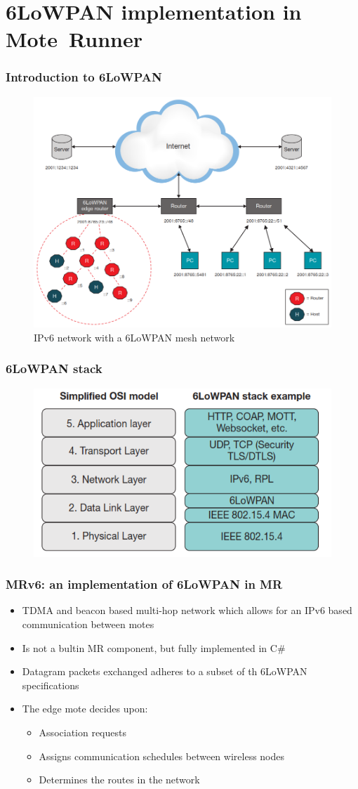 \section{6LoWPAN implementation in \mbox{Mote Runner}}
\begin{frame}[fragile]
  \frametitle{Introduction to 6LoWPAN}
  \begin{figure}
    \includegraphics[width=.7\textwidth]{img/6low_network.png}
    \caption{IPv6 network with a 6LoWPAN mesh network}
  \end{figure}
\end{frame}

\begin{frame}[fragile]
  \frametitle{6LoWPAN stack}
  \begin{figure}
    \includegraphics[width=.6\textwidth]{img/6low_stack.png}
  \end{figure}
\end{frame}

\begin{frame}[fragile]
  \frametitle{MRv6: an implementation of 6LoWPAN in MR}
  \begin{itemize}
    \item TDMA and beacon based multi-hop network which allows for an IPv6 based communication between motes
    \item Is not a bultin MR component, but fully implemented in C\#
    \item Datagram packets exchanged adheres to a subset of th 6LoWPAN specifications
    \item The edge mote decides upon:
    \begin{itemize}
      \item Association requests
      \item Assigns communication schedules between wireless nodes
      \item Determines the routes in the network
    \end{itemize}
  \end{itemize}
\end{frame}

